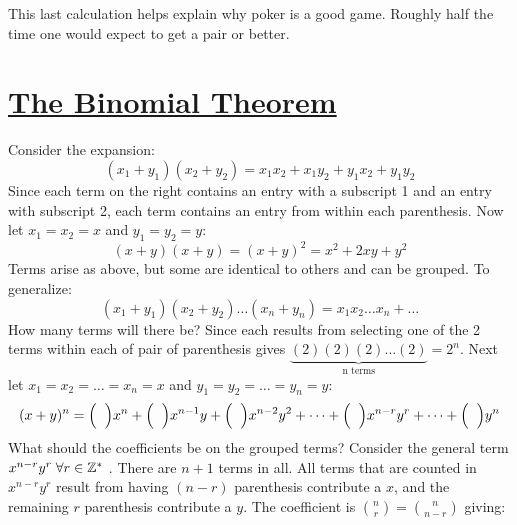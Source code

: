 \documentclass[12pt, letterpaper, onecolumn, conference, final]{IEEEtran}
\theoremstyle{definition}
\theoremstyle{plain}
\begin{document}
\noindent
This last calculation helps explain why poker is a good game. Roughly half the time one would expect to get a pair or better.

\newpage
\section{\textbf{\underline{The Binomial Theorem}}}
\vspace{.3cm}
\noindent
Consider the expansion:
\begin{equation*}
(x_1+y_1)(x_2+y_2) = x_1x_2 + x_1y_2 + y_1x_2 + y_1y_2
\end{equation*}
Since each term on the right contains an entry with a subscript 1 and an entry with subscript 2, each term contains an entry from within each parenthesis. Now let $x_1=x_2=x$ and $y_1=y_2=y$:
\begin{equation*}
(x+y)(x+y) = (x+y)^2 = x^2 + 2xy + y^2
\end{equation*}
Terms arise as above, but some are identical to others and can be grouped. To generalize:
\begin{equation*}
(x_1+y_1)(x_2+y_2)\dots(x_n+y_n) = x_1x_2\dots x_n + \dots
\end{equation*}
How many terms will there be? Since each results from selecting one of the 2 terms within each of pair of parenthesis gives $\underbrace{(2)(2)(2)\dots(2)}_{\text{n terms}} = 2^n$. Next let $x_1=x_2=\dots=x_n=x$ and $y_1=y_2=\dots=y_n=y$:
\begin{equation*}
(x+y)^n = \Big( \hspace{.2cm} \Big) x^n + \Big( \hspace{.2cm} \Big) x^{n-1} y + \Big( \hspace{.2cm} \Big) x^{n-2} y^2 + \dots + \Big( \hspace{.2cm} \Big) x^{n-r} y^r + \dots + \Big( \hspace{.2cm} \Big) y^n
\end{equation*}
What should the coefficients be on the grouped terms? Consider the general term $x^{n-r} y^r \hspace{.1cm} \forall r \in \mathbb{Z}^*$ \footnotemark. There are $n+1$ terms in all. All terms that are counted in $x^{n-r} y^r$ result from having $(n-r)$ parenthesis contribute a $x$, and the remaining $r$ parenthesis contribute a $y$. The coefficient is ${n \choose r} = {n \choose n-r}$ giving:
\end{document}
